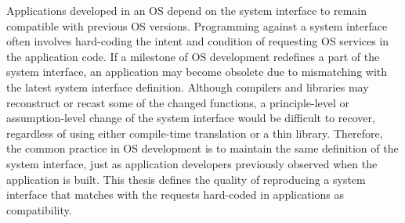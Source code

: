 



Applications developed in an OS depend on the system interface
to remain compatible with previous OS versions.
Programming against a system interface often involves
hard-coding the intent and condition of requesting OS services
in the application code.
If a milestone of OS development redefines a part of the system interface,
an application may become obsolete
due to mismatching with the latest system interface definition.
Although compilers and libraries may reconstruct or recast some of the changed functions,
a principle-level or assumption-level change of the system interface
would be difficult to recover,
regardless of using either compile-time translation or a thin library.
Therefore, the common practice in OS development is to maintain
the same definition of the system interface,
just as application developers previously observed when the application is built.
This thesis
defines
the quality of reproducing a system interface that matches with the requests hard-coded in applications
as compatibility.



